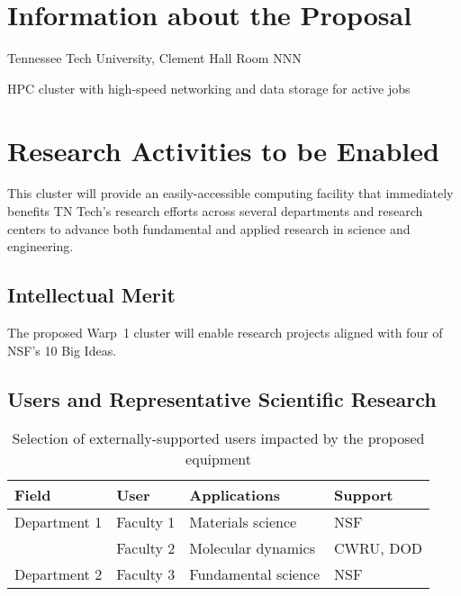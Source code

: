 \section{Information about the Proposal}

\begin{description}[labelwidth=1.7in,leftmargin=\labelwidth,labelsep=0pt]
\item[Instrument Location:] Tennessee Tech University, Clement Hall Room NNN
\item[Instrument Type:] HPC cluster with high-speed networking and data storage for active jobs
\end{description}

\section{Research Activities to be Enabled}

This cluster will provide an easily-accessible computing facility that immediately benefits TN Tech's research efforts across several departments and research centers to advance both fundamental and applied research in science and engineering.

\subsection{Intellectual Merit}

The proposed Warp~1 cluster will enable research projects aligned with four of NSF's 10 Big Ideas.

\subsection{Users and Representative Scientific Research}

\begin{table}
\centering
\caption{\label{tab:users} Selection of externally-supported users impacted by the proposed equipment}
\begin{tabular}{P{1.7in}P{1.5in}P{1.6in}P{1.25in}} \toprule
{\bfseries Field} & {\bfseries User} & {\bfseries Applications} & {\bfseries Support} \\ \midrule
Department 1 & Faculty 1 & Materials science & NSF \\
             & Faculty 2 & Molecular dynamics & CWRU, DOD \\ \addlinespace

Department 2 & Faculty 3 & Fundamental science & NSF \\ \bottomrule
\end{tabular}
\end{table}

